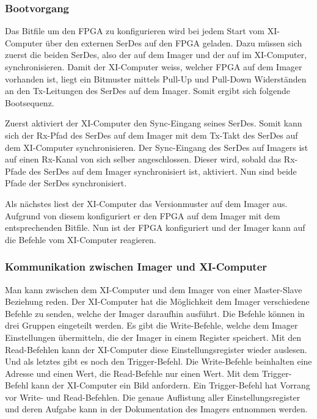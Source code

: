 \documentclass{article}
\begin{document}
\subsubsection*{Bootvorgang}
Das Bitfile um den FPGA zu konfigurieren wird bei jedem Start vom XI-Computer über den externen SerDes auf den FPGA geladen. Dazu müssen sich zuerst die beiden SerDes, also der auf dem Imager und der auf im XI-Computer, synchronisieren. Damit der XI-Computer weiss, welcher FPGA auf dem Imager vorhanden ist, liegt ein Bitmuster mittels Pull-Up und Pull-Down Widerständen an den Tx-Leitungen des SerDes auf dem Imager. Somit ergibt sich folgende Bootsequenz.

Zuerst aktiviert der XI-Computer den Sync-Eingang seines SerDes. Somit kann sich der Rx-Pfad des SerDes auf dem Imager mit dem Tx-Takt des SerDes auf dem XI-Computer synchronisieren. Der Sync-Eingang des SerDes auf Imagers ist auf einen Rx-Kanal von sich selber angeschlossen. Dieser wird, sobald das Rx-Pfade des SerDes auf dem Imager synchronisiert ist, aktiviert. Nun sind beide Pfade der SerDes synchronisiert.

Als nächstes liest der XI-Computer das Versionmuster auf dem Imager aus. Aufgrund von diesem konfiguriert er den FPGA auf dem Imager mit dem entsprechenden Bitfile. Nun ist der FPGA konfiguriert und der Imager kann auf die Befehle vom XI-Computer reagieren. 

\subsubsection*{Kommunikation zwischen Imager und XI-Computer}

Man kann zwischen dem XI-Computer und dem Imager von einer Master-Slave Beziehung reden. Der XI-Computer hat die Möglichkeit dem Imager verschiedene Befehle zu senden, welche der Imager daraufhin ausführt. Die Befehle können in drei Gruppen eingeteilt werden. Es gibt die Write-Befehle, welche dem Imager Einstellungen übermitteln, die der Imager in einem Register speichert. Mit den Read-Befehlen kann der XI-Computer diese Einstellungsregister wieder auslesen. Und als letztes gibt es noch den Trigger-Befehl. Die Write-Befehle beinhalten eine Adresse und einen Wert, die Read-Befehle nur einen Wert. Mit dem Trigger-Befehl kann der XI-Computer ein Bild anfordern. Ein Trigger-Befehl hat Vorrang vor Write- und Read-Befehlen. Die genaue Auflistung aller Einstellungsregister und deren Aufgabe kann in der Dokumentation des Imagers entnommen werden. 
\end{document}

